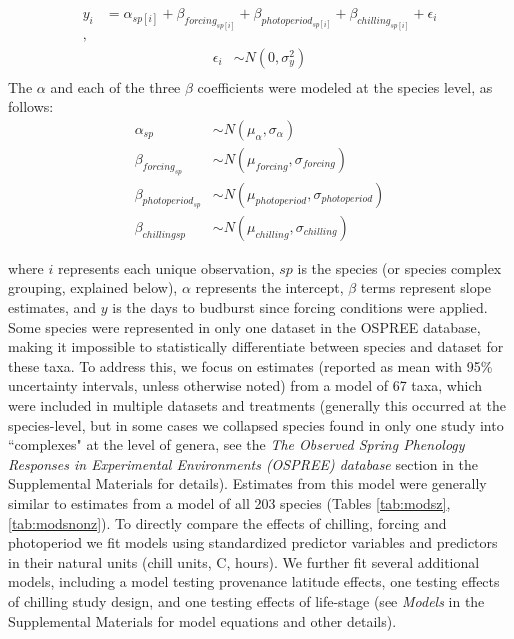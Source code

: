 \documentclass{article}
\begin{document}
\begin{align*}
y_i &= \alpha_{sp[i]} + \beta_{forcing_{sp[i]}} + \beta_{photoperiod_{sp[i]}} + \beta_{chilling_{sp[i]}} + \epsilon_i\\,
\end{align*}
\begin{align*}
\epsilon_i & \sim N(0,\sigma^2_y) \\
\end{align*}
\noindent The $\alpha$ and each of the three $\beta$ coefficients were modeled at the species level, as follows:
\begin{align*}
\alpha_{sp} & \sim N(\mu_{\alpha}, \sigma_{\alpha}) \\
\beta_{forcing_{sp}} & \sim N(\mu_{forcing}, \sigma_{forcing}) \\
\beta_{photoperiod_{sp}} & \sim N(\mu_{photoperiod}, \sigma_{photoperiod})\\
\beta_{chilling{sp}} & \sim N(\mu_{chilling}, \sigma_{chilling})
\end{align*}

where $i$ represents each unique observation, $sp$ is the species (or species complex grouping, explained below), $\alpha$ represents the intercept, $\beta$ terms represent slope estimates, and $y$ is the days to budburst since forcing conditions were applied. Some species were represented in only one dataset in the OSPREE database, making it impossible to statistically differentiate between species and dataset for these taxa. To address this, we focus on estimates (reported as mean with 95\% uncertainty intervals, unless otherwise noted) from a model of  67 taxa, which were included in multiple datasets and treatments (generally this occurred at the species-level, but in some cases we collapsed species found in only one study into ``complexes" at the level of genera, see the \emph{The Observed Spring Phenology Responses in Experimental Environments (OSPREE) database} section in the Supplemental Materials for details). Estimates from this model were generally similar to estimates from a model of all 203 species (Tables \ref{tab:modsz}, \ref{tab:modsnonz}). To directly compare the effects of chilling, forcing and photoperiod we fit models using standardized predictor variables \emph{\citep[][]{gelman2006}} and predictors in their natural units (chill units, \degree C, hours).  We further fit several additional models, including a model testing provenance latitude effects,  one testing effects of chilling study design, and one testing effects of life-stage (see \emph{Models} in the Supplemental Materials for model equations and other details). 
\end{document}
